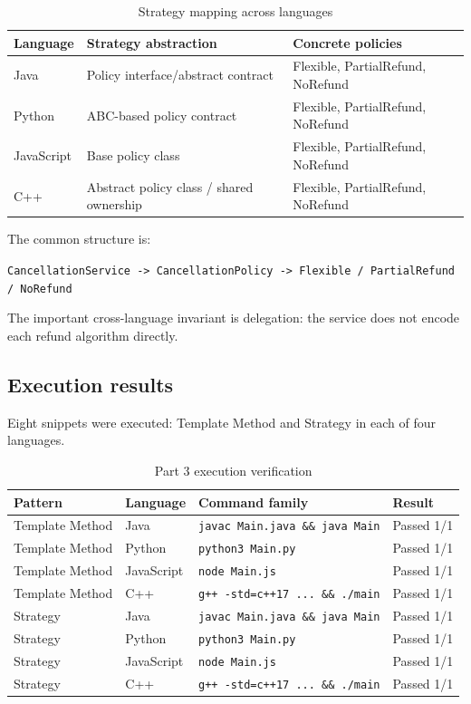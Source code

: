 \documentclass[10pt,a4paper]{article}
\newcommand{\code}[1]{\texttt{\small #1}}
\begin{document}
\begin{table}[H]
\centering
\caption{Strategy mapping across languages}
\label{tab:strategy-language}
\begin{tabularx}{\linewidth}{lXX}
\toprule
Language & Strategy abstraction & Concrete policies\\
\midrule
Java & Policy interface/abstract contract & Flexible, PartialRefund, NoRefund\\
Python & ABC-based policy contract & Flexible, PartialRefund, NoRefund\\
JavaScript & Base policy class & Flexible, PartialRefund, NoRefund\\
C++ & Abstract policy class / shared ownership & Flexible, PartialRefund, NoRefund\\
\bottomrule
\end{tabularx}
\end{table}

The common structure is:

\begin{center}
\code{CancellationService -> CancellationPolicy -> Flexible / PartialRefund / NoRefund}
\end{center}

The important cross-language invariant is delegation: the service does not encode each refund algorithm directly.

\subsection{Execution results}

Eight snippets were executed: Template Method and Strategy in each of four languages.

\begin{table}[H]
\centering
\caption{Part 3 execution verification}
\label{tab:execution}
\begin{tabular}{llll}
\toprule
Pattern & Language & Command family & Result\\
\midrule
Template Method & Java & \code{javac Main.java \&\& java Main} & Passed 1/1\\
Template Method & Python & \code{python3 Main.py} & Passed 1/1\\
Template Method & JavaScript & \code{node Main.js} & Passed 1/1\\
Template Method & C++ & \code{g++ -std=c++17 ... \&\& ./main} & Passed 1/1\\
Strategy & Java & \code{javac Main.java \&\& java Main} & Passed 1/1\\
Strategy & Python & \code{python3 Main.py} & Passed 1/1\\
Strategy & JavaScript & \code{node Main.js} & Passed 1/1\\
Strategy & C++ & \code{g++ -std=c++17 ... \&\& ./main} & Passed 1/1\\
\bottomrule
\end{tabular}
\end{table}
\end{document}
